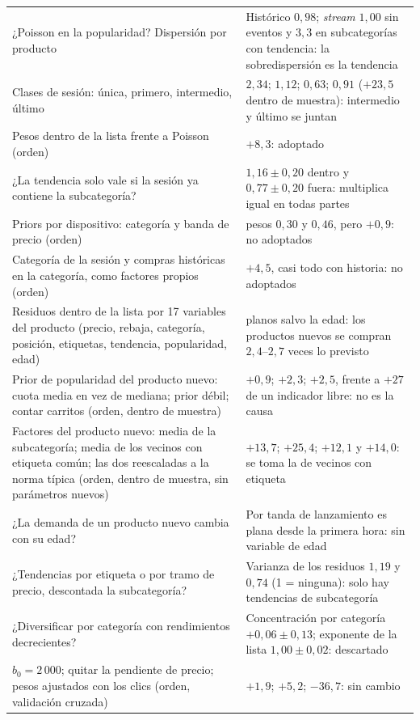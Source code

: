 \documentclass[11pt,a4paper]{article}
\begin{document}
\begin{center}
\begin{longtable}{@{}p{7.9cm}p{7.4cm}@{}}
¿Poisson en la popularidad? Dispersión por producto & Histórico $0{,}98$; \emph{stream} $1{,}00$ sin eventos y $3{,}3$ en subcategorías con tendencia: la sobredispersión es la tendencia\\
Clases de sesión: única, primero, intermedio, último & $2{,}34$; $1{,}12$; $0{,}63$; $0{,}91$ ($+23{,}5$ dentro de muestra): intermedio y último se juntan\\
Pesos dentro de la lista frente a Poisson (orden) & $+8{,}3$: adoptado\\
¿La tendencia solo vale si la sesión ya contiene la subcategoría? & $1{,}16\pm0{,}20$ dentro y $0{,}77\pm0{,}20$ fuera: multiplica igual en todas partes\\
Priors por dispositivo: categoría y banda de precio (orden) & pesos $0{,}30$ y $0{,}46$, pero $+0{,}9$: no adoptados\\
Categoría de la sesión y compras históricas en la categoría, como factores propios (orden) & $+4{,}5$, casi todo con historia: no adoptados\\
Residuos dentro de la lista por 17 variables del producto (precio, rebaja, categoría, posición, etiquetas, tendencia, popularidad, edad) & planos salvo la edad: los productos nuevos se compran $2{,}4$--$2{,}7$ veces lo previsto\\
Prior de popularidad del producto nuevo: cuota media en vez de mediana; prior débil; contar carritos (orden, dentro de muestra) & $+0{,}9$; $+2{,}3$; $+2{,}5$, frente a $+27$ de un indicador libre: no es la causa\\
Factores del producto nuevo: media de la subcategoría; media de los vecinos con etiqueta común; las dos reescaladas a la norma típica (orden, dentro de muestra, sin parámetros nuevos) & $+13{,}7$; $+25{,}4$; $+12{,}1$ y $+14{,}0$: se toma la de vecinos con etiqueta\\
¿La demanda de un producto nuevo cambia con su edad? & Por tanda de lanzamiento es plana desde la primera hora: sin variable de edad\\
¿Tendencias por etiqueta o por tramo de precio, descontada la subcategoría? & Varianza de los residuos $1{,}19$ y $0{,}74$ (1 = ninguna): solo hay tendencias de subcategoría\\
¿Diversificar por categoría con rendimientos decrecientes? & Concentración por categoría $+0{,}06\pm0{,}13$; exponente de la lista $1{,}00\pm0{,}02$: descartado\\
$b_0=2\,000$; quitar la pendiente de precio; pesos ajustados con los clics (orden, validación cruzada) & $+1{,}9$; $+5{,}2$; $-36{,}7$: sin cambio\\
\bottomrule
\end{longtable}
\end{center}
\end{document}
